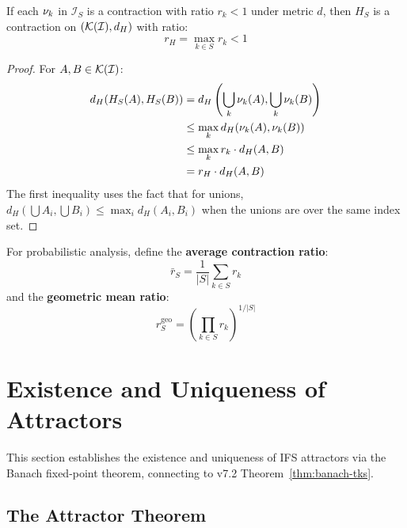 \begin{theorem}
\label{thm:hutchinson-contraction}
If each $\nu_{k}$ in $\mathcal{I}_S$ is a contraction with ratio $r_k < 1$ under metric $d$, then $H_S$ is a contraction on $(\mathcal{K}(\mathcal{I}), d_H)$ with ratio:
\[
r_H = \max_{k \in S} r_k < 1
\]
\end{theorem}

\begin{proof}
For $A, B \in \mathcal{K}(\mathcal{I})$:
\begin{align*}
d_H(H_S(A), H_S(B)) &= d_H\left(\bigcup_k \nu_{k}(A), \bigcup_k \nu_{k}(B)\right) \\
&\leq \max_k d_H(\nu_{k}(A), \nu_{k}(B)) \\
&\leq \max_k r_k \cdot d_H(A, B) \\
&= r_H \cdot d_H(A, B)
\end{align*}
The first inequality uses the fact that for unions, $d_H(\bigcup A_i, \bigcup B_i) \leq \max_i d_H(A_i, B_i)$ when the unions are over the same index set.
\end{proof}

\begin{definition}
\label{def:average-contraction}
For probabilistic analysis, define the \textbf{average contraction ratio}:
\[
\bar{r}_S = \frac{1}{|S|} \sum_{k \in S} r_k
\]
and the \textbf{geometric mean ratio}:
\[
r_S^{\mathrm{geo}} = \left(\prod_{k \in S} r_k\right)^{1/|S|}
\]
\end{definition}

\section{Existence and Uniqueness of Attractors}
\label{sec:attractor-existence}

\begin{tcolorbox}[colback=green!5!white,colframe=green!75!black,title=\textbf{Central Result}]
This section establishes the existence and uniqueness of IFS attractors via the Banach fixed-point theorem, connecting to v7.2 Theorem~\ref*{thm:banach-tks}.
\end{tcolorbox}

\subsection{The Attractor Theorem}

